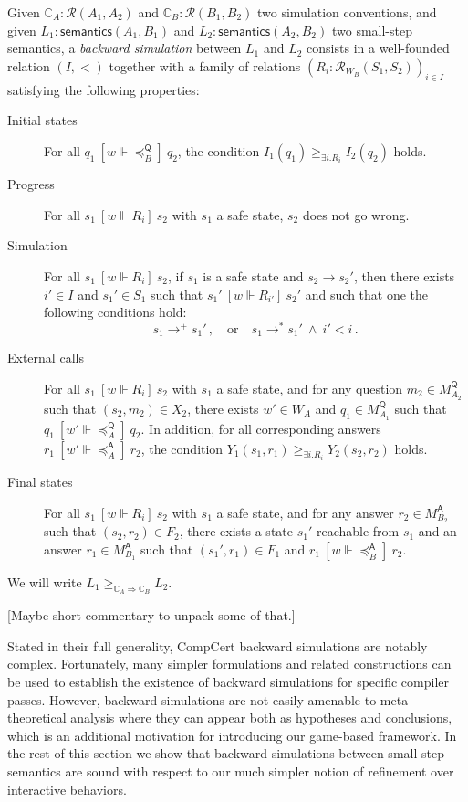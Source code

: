 \documentclass[acmsmall,timestamp,review,anonymous]{acmart}
\newcommand{\kw}[1]{\ensuremath{ \mathsf{#1} }}
\newcommand{\ifr}[1]{\ [{#1}]\ }
\begin{document}
\begin{definition}
Given
$\mathbb{C}_A : \mathcal{R}(A_1, A_2)$ and
$\mathbb{C}_B : \mathcal{R}(B_1, B_2)$
two simulation conventions,
and given
$L_1 : \kw{semantics}(A_1, B_1)$ and
$L_2 : \kw{semantics}(A_2, B_2)$
two small-step semantics,
a \emph{backward simulation} between $L_1$ and $L_2$
consists in a
well-founded relation $(I, <)$
together with a family of relations
$(R_i : \mathcal{R}_{W_B}(S_1, S_2))_{i \in I}$
satisfying the following properties:
\begin{description}
\item[Initial states]
  For all
  $q_1 \ifr{w \Vdash {\preceq}_B^\kw{Q}} q_2$,
  the condition $I_1(q_1) \ge_{\exists i . R_i} I_2(q_2)$ holds.
\item[Progress]
  For all $s_1 \ifr{w \Vdash R_i} s_2$
  with $s_1$ a safe state,
  $s_2$ does not go wrong.
\item[Simulation]
  For all $s_1 \ifr{w \Vdash R_i} s_2$,
  if $s_1$ is a safe state and $s_2 \rightarrow s_2'$,
  then there exists $i' \in I$ and $s_1' \in S_1$
  such that $s_1' \ifr{w \Vdash R_{i'}} s_2'$ and
  such that one the following conditions hold:
  \[
    s_1 \rightarrow^+ s_1' \,, \quad \mbox{or} \quad
    s_1 \rightarrow^* s_1' \:\wedge\: i' < i \,.
  \]
\item[External calls]
  For all $s_1 \ifr{w \Vdash R_i} s_2$
  with $s_1$ a safe state, and
  for any question $m_2 \in M_{A_2}^\kw{Q}$
  such that $(s_2, m_2) \in X_2$,
  there exists $w' \in W_A$ and $q_1 \in M_{A_1}^\kw{Q}$
  such that $q_1 \ifr{w' \Vdash {\preceq}_A^\kw{Q}} q_2$.
  In addition, for all corresponding answers
  $r_1 \ifr{w' \Vdash {\preceq}_A^\kw{A}} r_2$,
  the condition $Y_1(s_1, r_1) \ge_{\exists i . R_i} Y_2(s_2, r_2)$ holds.
\item[Final states]
  For all $s_1 \ifr{w \Vdash R_i} s_2$
  with $s_1$ a safe state, and
  for any answer $r_2 \in M_{B_2}^\kw{A}$
  such that $(s_2, r_2) \in F_2$,
  there exists a state $s_1'$ reachable from $s_1$ and
  an answer $r_1 \in M_{B_1}^\kw{A}$ such that
  $(s_1', r_1) \in F_1$ and $r_1 \ifr{w \Vdash {\preceq}_B^\kw{A}} r_2$.
\end{description}
We will write $L_1 \ge_{\mathbb{C}_A \Rightarrow \mathbb{C}_B} L_2$.
\end{definition}

[Maybe short commentary to unpack some of that.]

Stated in their full generality,
CompCert backward simulations are notably complex.
Fortunately,
many simpler formulations and related constructions
can be used to establish
the existence of backward simulations
for specific compiler passes.
However,
backward simulations are not easily amenable to
meta-theoretical analysis
where they can appear both as hypotheses and conclusions,
which is an additional motivation for introducing
our game-based framework.
In the rest of this section we show that
backward simulations between small-step semantics
are sound with respect to
our much simpler notion of refinement
over interactive behaviors.
\end{document}
